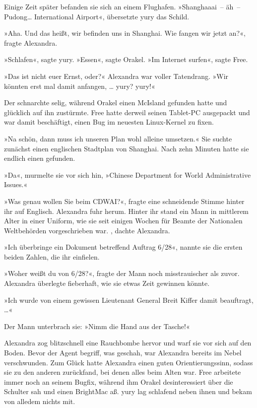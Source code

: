Einige Zeit später befanden sie sich an einem Flughafen. »Shanghaaai~– äh~– Pudong… International Airport«, übersetzte yury das Schild.

»Aha. Und das heißt, wir befinden uns in Shanghai. Wie fangen wir jetzt an?«, fragte Alexandra.

»Schlafen«, sagte yury. »Essen«, sagte Orakel. »Im Internet surfen«, sagte Free.

»Das ist nicht euer Ernst, oder?« Alexandra war voller Tatendrang. »Wir könnten erst mal damit anfangen, … yury? yury!«

Der schnarchte selig, während Orakel einen McIsland gefunden hatte und glücklich auf ihn zustürmte. Free hatte derweil seinen Tablet-PC ausgepackt und war damit beschäftigt, einen Bug im neuesten Linux-Kernel zu fixen.

»Na schön, dann muss ich unseren Plan wohl alleine umsetzen.« Sie suchte zunächst einen englischen Stadtplan von Shanghai. Nach zehn Minuten hatte sie endlich einen gefunden.

»Da«, murmelte sie vor sich hin, »Chinese Department for World Administrative Issues.«

»Was genau wollen Sie beim CDWAI?«, fragte eine schneidende Stimme hinter ihr auf Englisch. Alexandra fuhr herum. Hinter ihr stand ein Mann in mittlerem Alter in einer Uniform, wie sie seit einigen Wochen für Beamte der Nationalen Weltbehörden vorgeschrieben war. , dachte Alexandra.

»Ich überbringe ein Dokument betreffend Auftrag 6/28«, nannte sie die ersten beiden Zahlen, die ihr einfielen.

»Woher weißt du von 6/28?«, fragte der Mann noch misstrauischer als zuvor. Alexandra überlegte fieberhaft, wie sie etwas Zeit gewinnen könnte.

»Ich wurde von einem gewissen Lieutenant General Breit Kiffer damit beauftragt, …«

Der Mann unterbrach sie: »Nimm die Hand aus der Tasche!«

Alexandra zog blitzschnell eine Rauchbombe hervor und warf sie vor sich auf den Boden. Bevor der Agent begriff, was geschah, war Alexandra bereits im Nebel verschwunden. Zum Glück hatte Alexandra einen guten Orientierungssinn, sodass sie zu den anderen zurückfand, bei denen alles beim Alten war. Free arbeitete immer noch an seinem Bugfix, während ihm Orakel desinteressiert über die Schulter sah und einen BrightMac aß. yury lag schlafend neben ihnen und bekam von alledem nichts mit.

